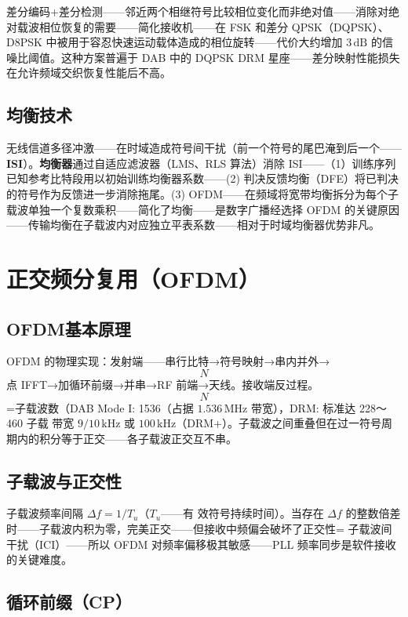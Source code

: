 \documentclass[12pt,UTF8]{ctexbook}
\begin{document}
差分编码+差分检测——邻近两个相继符号比较相位变化而非绝对值——消除对绝对载波相位恢复的需要——简化接收机——在 FSK 和差分 QPSK（DQPSK）、D8PSK 中被用于容忍快速运动载体造成的相位旋转——代价大约增加 $3\,\mathrm{dB}$ 的信噪比阈值。这种方案普遍于 DAB 中的 DQPSK DRM 星座——差分映射性能损失在允许频域交织恢复性能后不高。

\subsection{均衡技术}

无线信道多径冲激——在时域造成符号间干扰（前一个符号的尾巴淹到后一个——\textbf{ISI}）。\textbf{均衡器}通过自适应滤波器（LMS、RLS 算法）消除 ISI——（1）训练序列已知参考比特段用以初始训练均衡器系数——(2) 判决反馈均衡（DFE）将已判决的符号作为反馈进一步消除拖尾。(3) OFDM——在频域将宽带均衡拆分为每个子载波单独一个复数乘积——简化了均衡——是数字广播经选择 OFDM 的关键原因——传输均衡在子载波内对应独立平表系数——相对于时域均衡器优势非凡。

\section{正交频分复用（OFDM）}
\label{sec:ofdm}

\subsection{OFDM基本原理}

OFDM 的物理实现：发射端——串行比特→符号映射→串内并外→$$N$$点 IFFT→加循环前缀→并串→RF 前端→天线。接收端反过程。$$N$$=子载波数（DAB Mode I: 1536（占据 $1.536\,\mathrm{MHz}$ 带宽），DRM: 标准达 228～460 子载 带宽 $9/10\,\mathrm{kHz}$ 或 $100\,\mathrm{kHz}$（DRM+）。子载波之间重叠但在过一符号周期内的积分等于正交——各子载波正交互不串。

\subsection{子载波与正交性}

子载波频率间隔 $Δf = 1/T_u$（$T_u$——有 效符号持续时间）。当存在 $Δf$ 的整数倍差时——子载波内积为零，完美正交——但接收中频偏会破坏了正交性= 子载波间干扰（ICI）——所以 OFDM 对频率偏移极其敏感——PLL 频率同步是软件接收的关键难度。

\subsection{循环前缀（CP）}
\end{document}
